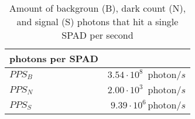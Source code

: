 \begin{table}[H]
\centering
\caption{Amount of backgroun (B), dark count (N), and signal (S) photons that hit a single SPAD per second}
\label{tab:photons_per_SPAD}
\begin{tabular}{|l|r|}\hline
    \textbf{photons per SPAD} & \\
    \hline 
    $PPS_B$ & $3.54\cdot10^{8}\, \text{ photon}/s$ \\
    $PPS_N$ & $2.00\cdot10^{3}\, \text{ photon}/s$ \\
    $PPS_S$ & $9.39\cdot10^{6}\, \text{photon}/s$ \\
    \hline 
\end{tabular}
\end{table}
